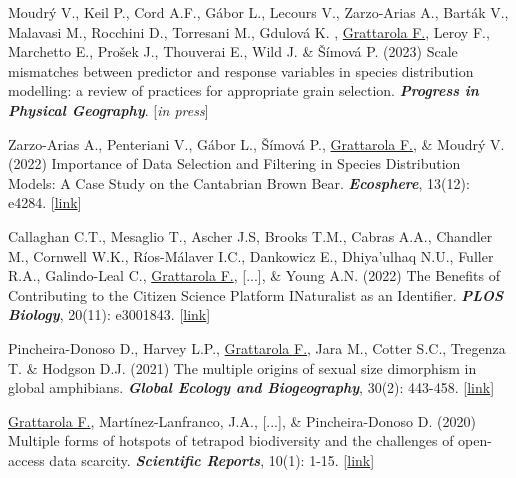 \documentclass[9pt]{developercv} %
\begin{document}


\begin{etaremune}

\item Moudrý V., Keil P., Cord A.F., Gábor L., Lecours V., Zarzo-Arias A., Barták V.,  Malavasi M., Rocchini D., Torresani M., Gdulová K. , \underline{Grattarola F.}, Leroy F., Marchetto E., Prošek J., Thouverai E., Wild J.  \& Šímová P. (2023) Scale mismatches between predictor and response variables in species distribution modelling: a review of practices for appropriate grain selection. \textit{\textbf{Progress in Physical Geography}}. [\textit{in press}]

\item Zarzo-Arias A., Penteriani V.,  Gábor L., Šímová P.,  \underline{Grattarola F.}, \& Moudrý V. (2022) Importance of Data Selection and Filtering in Species Distribution Models: A Case Study on the Cantabrian Brown Bear. \textit{\textbf{Ecosphere}}, 13(12): e4284. [\href{https://doi.org/10.1002/ecs2.4284}{link}]

\item Callaghan C.T., Mesaglio T., Ascher J.S, Brooks T.M., Cabras A.A., Chandler M., Cornwell W.K., Ríos-Málaver I.C., Dankowicz E., Dhiya’ulhaq N.U., Fuller R.A., Galindo-Leal C., \underline{Grattarola F.}, [...], \& Young A.N. (2022) The Benefits of Contributing to the Citizen Science Platform INaturalist as an Identifier. \textit{\textbf{PLOS Biology}}, 20(11): e3001843. [\href{https://doi.org/10.1371/journal.pbio.3001843}{link}]

\item Pincheira-Donoso D., Harvey L.P., \underline{Grattarola F.}, Jara M., Cotter S.C., Tregenza T. \& Hodgson D.J. (2021) The multiple origins of sexual size dimorphism in global amphibians. \textit{\textbf{Global Ecology and Biogeography}}, 30(2): 443-458. [\href{https://doi.org/10.1111/geb.13230}{link}]

\item \underline{Grattarola F.}, Martínez-Lanfranco, J.A., [...], \& Pincheira-Donoso D. (2020) Multiple forms of hotspots of tetrapod biodiversity and the challenges of open-access data scarcity. \textit{\textbf{Scientific Reports}}, 10(1): 1-15. [\href{https://doi.org/10.1038/s41598-020-79074-8}{link}]


\end{etaremune}
\end{document}
